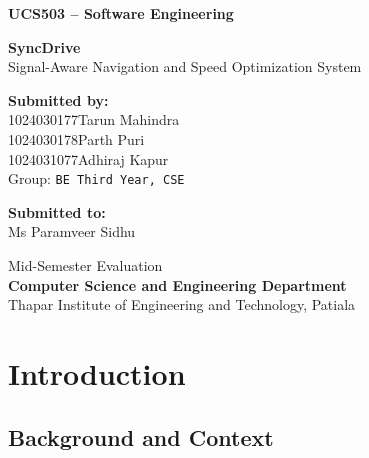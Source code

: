 \documentclass[12pt,a4paper]{report}
\begin{document}
\begin{titlepage}
\thispagestyle{empty}
\centering
\vspace*{2.2cm}

{\large\textbf{UCS503 -- Software Engineering}}

\vspace{1.6cm}

{\Huge\textbf{SyncDrive}}\\[0.45cm]
{\large Signal-Aware Navigation and Speed Optimization System}

\vspace{3.2cm}

\textbf{Submitted by:}\\[0.35cm]
{\normalsize
1024030177\quad Tarun Mahindra\\[2pt]
1024030178\quad Parth Puri\\[2pt]
1024031077\quad Adhiraj Kapur\\[8pt]
}
Group: \texttt{BE Third Year, CSE}

\vspace{2.8cm}

\textbf{Submitted to:}\\[0.35cm]
Ms Paramveer Sidhu

\vspace{2.8cm}

Mid-Semester Evaluation\\[4pt]
{\large\textbf{Computer Science and Engineering Department}}\\[4pt]
Thapar Institute of Engineering and Technology, Patiala

\end{titlepage}

\setcounter{page}{1}
\tableofcontents
\newpage

\chapter{Introduction}

\section{Background and Context}
\end{document}
